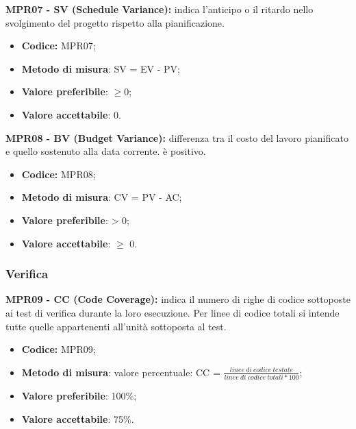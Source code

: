 \textbf{MPR07 - SV (Schedule Variance):} indica l'anticipo o il ritardo nello svolgimento del progetto rispetto alla pianificazione.
\begin{itemize}
    \item \textbf{Codice:} MPR07;
    \item \textbf{Metodo di misura}: SV = EV - PV;
    \item \textbf{Valore preferibile}: $\geq 0$;
    \item \textbf{Valore accettabile}: 0.
\end{itemize}
\textbf{MPR08 - BV (Budget Variance):} differenza tra il costo del lavoro pianificato e quello sostenuto alla data corrente.
è positivo.
\begin{itemize}
    \item \textbf{Codice:} MPR08;
    \item \textbf{Metodo di misura}: CV = PV - AC;
    \item \textbf{Valore preferibile}: > 0;
    \item \textbf{Valore accettabile}: $\geq$ 0.
\end{itemize}
\subsubsection{Verifica}
\textbf{MPR09 - CC (Code Coverage):} indica il numero di righe di codice sottoposte ai test di verifica durante la loro esecuzione. Per linee di codice totali
si intende tutte quelle appartenenti all'unità sottoposta al test.
\begin{itemize}
    \item \textbf{Codice:} MPR09;
    \item \textbf{Metodo di misura}: valore percentuale: CC = $\frac{linee \ di \ codice \ testate}{linee \ di \ codice \ totali * 100}$;
    \item \textbf{Valore preferibile}: 100\%;
    \item \textbf{Valore accettabile}: 75\%.
\end{itemize}
